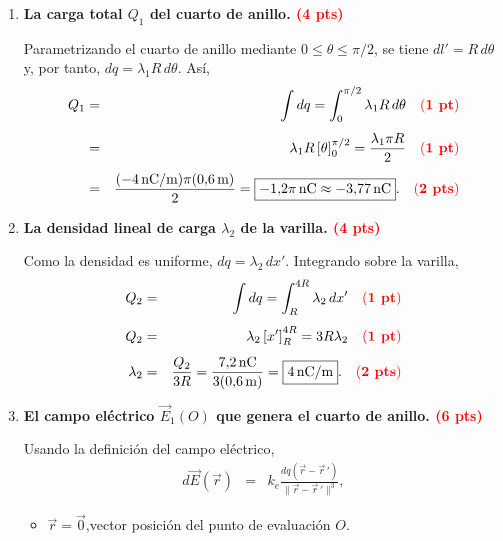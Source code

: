 \documentclass{article}
\newcommand{\ke}{k_e}
\begin{document}
\begin{enumerate}[label={\alph*)}]

\item \textbf{La carga total $Q_1$ del cuarto de anillo.
      \textcolor{red}{(\textbf{4 pts})}}

Parametrizando el cuarto de anillo mediante $0\leq\theta\leq\pi/2$, se tiene
$dl'=R\,d\theta$ y, por tanto, $dq=\lambda_1R\,d\theta$. Así,
\begin{eqnarray*}
  Q_1 &=& \int dq=\int_0^{\pi/2}\lambda_1R\,d\theta
  \quad{\color{red}(\textbf{1 pt})}
  \\[4pt]
  &=& \lambda_1R\left[\theta\right]_0^{\pi/2}
  =\frac{\lambda_1\pi R}{2}
  \quad{\color{red}(\textbf{1 pt})}\\[4pt]
  &=& \frac{(-4\,\text{nC/m})\pi(0{,}6\,\text{m})}{2}
  =\boxed{-1{,}2\pi\,\text{nC}\approx-3{,}77\,\text{nC}}.
  \quad{\color{red}(\textbf{2 pts})}
\end{eqnarray*}

\item \textbf{La densidad lineal de carga $\lambda_2$ de la varilla.
      \textcolor{red}{(\textbf{4 pts})}}

Como la densidad es uniforme, $dq=\lambda_2\,dx'$. Integrando sobre la varilla,
\begin{eqnarray*}
  Q_2 &=& \int dq=\int_R^{4R}\lambda_2\,dx'
  \quad{\color{red}(\textbf{1 pt})}\\[4pt]
  Q_2 &=& \lambda_2\left[x'\right]_R^{4R}=3R\lambda_2
  \quad{\color{red}(\textbf{1 pt})}\\[4pt]
  \lambda_2 &=& \frac{Q_2}{3R}
  =\frac{7{,}2\,\text{nC}}{3(0{,}6\,\text{m})}
  =\boxed{4\,\text{nC/m}}.
  \quad{\color{red}(\textbf{2 pts})}
\end{eqnarray*}

\item \textbf{El campo eléctrico $\vec E_1(O)$ que genera el cuarto de anillo.
      \textcolor{red}{(\textbf{6 pts})}}

Usando la definición del campo eléctrico,
\begin{eqnarray*}
  d\vec{E}(\vec{r}) &=& \ke\frac{dq\left(\vec{r}-\vec{r}\,'\right)}{\|\vec{r}-\vec{r}\,'\|^3},
\end{eqnarray*}

\begin{itemize}[leftmargin=2em, itemsep=4pt]
  \item $\vec r = \vec 0$,\quad vector posición del punto de evaluación $O$.


\end{itemize}
\end{enumerate}
\end{document}

